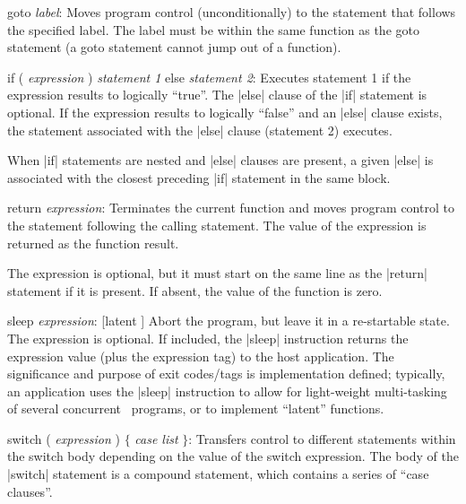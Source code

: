 \item goto {\it label\/}:
        Moves program control (unconditionally) to the statement that follows
        the specified label. The label must be within the same function as the
        goto statement (a goto statement cannot jump out of a function).

\item if ( {\it expression\/} ) {\it statement 1\/} else {\it statement 2\/}:
        \noindent{}%
        Executes statement 1 if the expression results to logically ``true''.
        The |else| clause of the |if| statement is optional. If the expression
        results to logically ``false'' and an |else| clause exists, the
        statement associated with the |else| clause (statement 2) executes.

        When |if| statements are nested and |else| clauses are present, a
        given |else| is associated with the closest preceding |if| statement
        in the same block.

\item return {\it expression\/}:
        \noindent{}%
        Terminates the current function and moves program control to the
        statement following the calling statement. The value of the expression
        is returned as the function result.

        The expression is optional, but it must start on the same line as the
        |return| statement if it is present. If absent, the value of the
        function is zero.

\item sleep {\it expression\/}:
          [latent \midtilde]%
        Abort the program, but leave it in a re-startable state. The expression
        is optional. If included, the |sleep| instruction returns the expression
        value (plus the expression tag) to the host application. The
        significance and purpose of exit codes\slash tags is implementation
        defined; typically, an application uses the |sleep| instruction to allow
        for light-weight multi-tasking of several concurrent \Small\ programs,
        or to implement ``latent'' functions.

\item switch ( {\it expression\/} ) {\tt $\{$} {\it case list\/} {\tt $\}$}:
        Transfers control to different statements within the switch body
        depending on the value of the switch expression. The body of the
        |switch| statement is a compound statement, which contains a
        series of ``case clauses''.

